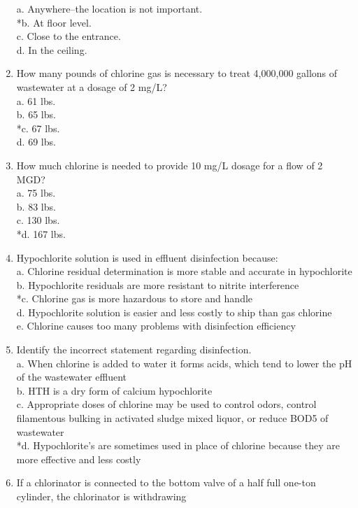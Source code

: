 \begin{enumerate}
a. Anywhere--the location is not important. \\
*b. At floor level. \\
c. Close to the entrance. \\
d. In the ceiling. \\
\item How many pounds of chlorine gas is necessary to treat 4,000,000 gallons of wastewater at a dosage of 2 mg/L? \\
a. 61 lbs. \\
b. 65 lbs. \\
*c. 67 lbs. \\
d. 69 lbs. \\
\item How much chlorine is needed to provide 10 mg/L dosage for a flow of 2 MGD? \\
a. 75 lbs. \\
b. 83 lbs. \\
c. 130 lbs. \\
*d. 167 lbs. \\
\item Hypochlorite solution is used in effluent disinfection because: \\
a. Chlorine residual determination is more stable and accurate in hypochlorite \\
b. Hypochlorite residuals are more resistant to nitrite interference \\
*c. Chlorine gas is more hazardous to store and handle \\
d. Hypochlorite solution is easier and less costly to ship than gas chlorine \\
e. Chlorine causes too many problems with disinfection efficiency \\
\item Identify the incorrect statement regarding disinfection. \\
a. When chlorine is added to water it forms acids, which tend to lower the pH of the wastewater effluent \\
b. HTH is a dry form of calcium hypochlorite \\
c. Appropriate doses of chlorine may be used to control odors, control filamentous bulking in activated sludge mixed liquor, or reduce BOD5 of wastewater \\
*d. Hypochlorite’s are sometimes used in place of chlorine because they are more effective and less costly \\
\item If a chlorinator is connected to the bottom valve of a half full one-ton cylinder, the chlorinator is withdrawing \\

\end{enumerate}
